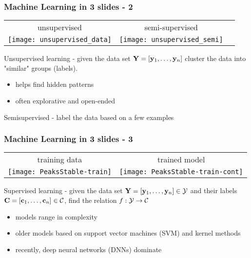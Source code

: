 \documentclass[12pt,fleqn]{beamer}
\begin{document}
\begin{frame}\frametitle{Machine Learning in 3 slides - 2}
	
\begin{center}
	\begin{tabular}{ccc}
		unsupervised & semi-supervised \\
		\texttt{[image: unsupervised\_data]}&
		\texttt{[image: unsupervised\_semi]}		
	\end{tabular}
\end{center}

Unsupervised learning - given the data set ${\bf Y} = [{\bf y}_1,\ldots,{\bf y}_n]$
cluster the data into "similar" groups (labels).
 
\bigskip

\begin{itemize}
\item helps find hidden patterns
\item often explorative and open-ended
\end{itemize}

\bigskip

Semisupervised - label the data based on a few examples


\end{frame}

\begin{frame}\frametitle{Machine Learning in 3 slides - 3}
	
	\begin{center}
		\begin{tabular}{cc}
			training data & trained model\\
			\texttt{[image: PeaksStable-train]}
			&
			\texttt{[image: PeaksStable-train-cont]}
		\end{tabular}
	\end{center}
	

Supervised learning - given the data set ${\bf Y} = [{\bf y}_1,\ldots,{\bf y}_n] \in {\cal Y}$
and their labels ${\bf C} = [{\bf c}_1,\ldots,{\bf c}_n] \in {\cal C}$, find the relation $f:{\cal Y}\rightarrow {\cal C}$
 
\bigskip

\begin{itemize}
\item models range in complexity
\item older models based on support vector machines (SVM) and kernel methods
\item recently, deep neural networks (DNNs) dominate
\end{itemize}
\end{frame}
\end{document}
